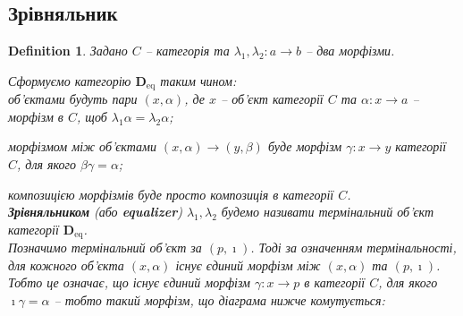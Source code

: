 \documentclass[a4paper, 10pt]{article}
\theoremstyle{theoremdd}
\newtheorem{definition}[theorem]{Definition}
\begin{document}

\subsection{Зрівняльник}
\begin{definition}
Задано $C$ -- категорія та $\lambda_1,\lambda_2 \colon a \to b$ -- два морфізми.
\begin{figure}[H]
\centering
{}
\end{figure}
\noindent
Сформуємо категорію $\textbf{D}_{\text{eq}}$ таким чином:\\
об'єктами будуть пари $(x,\alpha)$, де $x$ -- об'єкт категорії $C$ та $\alpha \colon x \to a$ -- морфізм в $C$, щоб $\lambda_1 \alpha = \lambda_2 \alpha$;
\begin{figure}[H]
\centering
{}
\end{figure}
\noindent
морфізмом між об'єктами $(x,\alpha) \to (y,\beta)$ буде морфізм $\gamma \colon x \to y$ категорії $C$, для якого $\beta \gamma = \alpha$;
\begin{figure}[H]
\centering
{}
\end{figure}
\noindent
композицією морфізмів буде просто композиція в категорії $C$.\\
\textbf{Зрівняльником} (або \textbf{equalizer}) $\lambda_1,\lambda_2$ будемо називати термінальний об'єкт категорії $\textbf{D}_{\text{eq}}$.
\bigskip \\
Позначимо термінальний об'єкт за $(p,\imath)$. Тоді за означенням термінальності, для кожного об'єкта $(x,\alpha)$ існує єдиний морфізм між $(x,\alpha)$ та $(p,\imath)$. Тобто це означає, що існує єдиний морфізм $\gamma \colon x \to p$ в категорії $C$, для якого $\imath \gamma = \alpha$ -- тобто такий морфізм, що діаграма нижче комутується:
\begin{figure}[H]
\centering
{}
\end{figure}
\end{definition}
\end{document}
